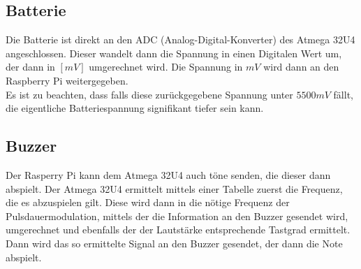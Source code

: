 \documentclass[a4paper, 12pt]{article}
\begin{document}
\subsection*{Batterie}
Die Batterie ist direkt an den ADC (Analog-Digital-Konverter) des Atmega 32U4 angeschlossen. Dieser wandelt dann die Spannung in einen Digitalen Wert um, der dann in $[mV]$ umgerechnet wird. Die Spannung in $mV$ wird dann an den Raspberry Pi weitergegeben.\\
Es ist zu beachten, dass falls diese zurückgegebene Spannung unter $5500 mV$ fällt, die eigentliche Batteriespannung signifikant tiefer sein kann.

\subsection*{Buzzer}
Der Rasperry Pi kann dem Atmega 32U4 auch töne senden, die dieser dann abspielt. Der Atmega 32U4 ermittelt mittels einer Tabelle zuerst die Frequenz, die es abzuspielen gilt. Diese wird dann in die nötige Frequenz der Pulsdauermodulation, mittels der die Information an den Buzzer gesendet wird, umgerechnet und ebenfalls der der Lautstärke entsprechende Tastgrad ermittelt. Dann wird das so ermittelte Signal an den Buzzer gesendet, der dann die Note abspielt.

\begin{landscape}
	\LARGE
	\hspace{-2.5cm}
	\resizebox{!}{\textheight}{
		
	}
\end{landscape}
	
\end{document}
